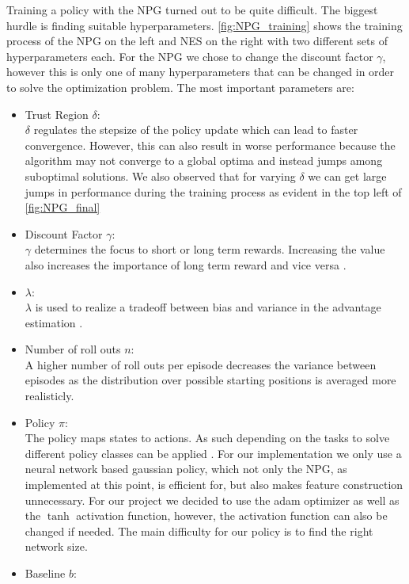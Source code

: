 Training a policy with the NPG turned out to be quite difficult. The biggest hurdle is finding suitable hyperparameters. \autoref{fig:NPG_training} shows the training process of the NPG on the left and NES on the right with two different sets of hyperparameters each. For the NPG we chose to change the discount factor $\gamma$, however this is only one of many hyperparameters that can be changed in order to solve the optimization problem. \newpage
The most important parameters are:
\begin{itemize}
  \item Trust Region $\delta$: \\
  $\delta$ regulates the stepsize of the policy update which can lead to faster convergence. However, this can also result in worse performance because the algorithm may not converge to a global optima and instead jumps among suboptimal solutions. We also observed that for varying $\delta$ we can get large jumps in performance during the training process as evident in the top left of \autoref{fig:NPG_final} \smallskip
  \item Discount Factor $\gamma$: \\
  $\gamma$ determines the focus to short or long term rewards. Increasing the value also increases the importance of long term reward and vice versa \cite{Schulman2018}. \smallskip
  \item $\lambda$: \\
  $\lambda$ is used to realize a tradeoff between bias and variance in the advantage estimation \cite{Schulman2018}. \smallskip
  \item Number of roll outs $n$: \\
  A higher number of roll outs per episode decreases the variance between episodes as the distribution over possible starting positions is averaged more realisticly.\smallskip
  \item Policy $\pi$: \\
  The policy maps states to actions. As such depending on the tasks to solve different policy classes can be applied \cite{Rajeswaran2017}. For our implementation we only use a neural network based gaussian policy, which not only the NPG, as implemented at this point, is efficient for, but also makes feature construction unnecessary. For our project we decided to use the adam optimizer as well as the $\tanh$ activation function, however, the activation function can also be changed if needed. The main difficulty for our policy is to find the right network size. \smallskip
  \item Baseline $b$: \\

\end{itemize}
